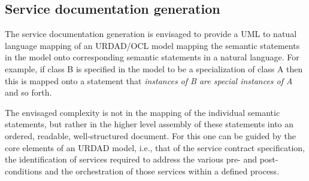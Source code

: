 \subsection{Service documentation generation}

The service documentation generation is envisaged to provide a UML to natual language mapping of an URDAD/OCL
model mapping the semantic statements in the model onto corresponding semantic statements in a natural language.
For example, if class B is specified in the model to be a specialization of class A then this is mapped onto a statement
that {\em instances of B are special instances of A} and so forth.

The envisaged complexity is not in the mapping of the individual semantic statements, but rather in the higher level
assembly of these statements into an ordered, readable, well-structured document. For this one can be guided by
the core elements of an URDAD model, i.e., that of the service contract specification, the identification of services
required to address the various pre- and post-conditions and the orchestration of those services within a defined
process.
